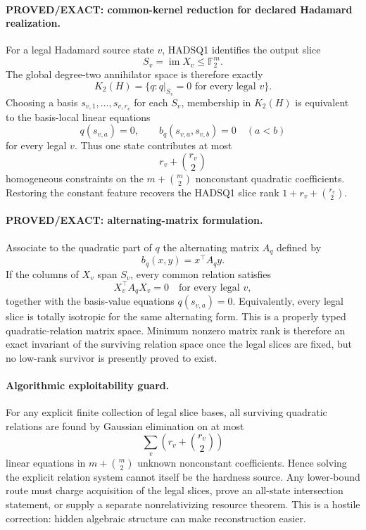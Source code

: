\documentclass[11pt]{article}
\begin{document}
\paragraph{PROVED/EXACT: common-kernel reduction for declared Hadamard realization.}
For a legal Hadamard source state \(v\), HADSQ1 identifies the output slice
\[
S_v=\operatorname{im}X_v\le\mathbb F_2^m.
\]
The global degree-two annihilator space is therefore exactly
\[
\boxed{
K_2(H)=\{q:q|_{S_v}=0\text{ for every legal }v\}.}
\]
Choosing a basis \(s_{v,1},\ldots,s_{v,r_v}\) for each \(S_v\), membership in \(K_2(H)\) is equivalent to the basis-local linear equations
\[
q(s_{v,a})=0,\qquad
b_q(s_{v,a},s_{v,b})=0\quad(a<b)
\]
for every legal \(v\). Thus one state contributes at most
\[
r_v+\binom{r_v}{2}
\]
homogeneous constraints on the \(m+\binom m2\) nonconstant quadratic coefficients. Restoring the constant feature recovers the HADSQ1 slice rank
\(1+r_v+\binom{r_v}{2}\).

\paragraph{PROVED/EXACT: alternating-matrix formulation.}
Associate to the quadratic part of \(q\) the alternating matrix \(A_q\) defined by
\[
b_q(x,y)=x^\top A_qy.
\]
If the columns of \(X_v\) span \(S_v\), every common relation satisfies
\[
\boxed{X_v^\top A_qX_v=0\quad\text{for every legal }v,}
\]
together with the basis-value equations \(q(s_{v,a})=0\). Equivalently, every legal slice is totally isotropic for the same alternating form. This is a properly typed quadratic-relation matrix space. Minimum nonzero matrix rank is therefore an exact invariant of the surviving relation space once the legal slices are fixed, but no low-rank survivor is presently proved to exist.

\paragraph{Algorithmic exploitability guard.}
For any explicit finite collection of legal slice bases, all surviving quadratic relations are found by Gaussian elimination on at most
\[
\sum_v\left(r_v+\binom{r_v}{2}\right)
\]
linear equations in \(m+\binom m2\) unknown nonconstant coefficients. Hence solving the explicit relation system cannot itself be the hardness source. Any lower-bound route must charge acquisition of the legal slices, prove an all-state intersection statement, or supply a separate nonrelativizing resource theorem. This is a hostile correction: hidden algebraic structure can make reconstruction easier.
\end{document}
